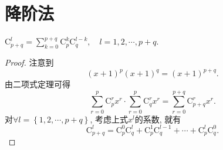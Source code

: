 \documentclass[../../main.tex]{subfiles}%
\begin{document}
\section{降阶法}

\begin{theorem}[Vandermode恒等式]\label{theorem:Vandermode恒等式}
$\mathrm{C}_{p+q}^{l}=\sum_{k=0}^{p+q}{\mathrm{C}_{p}^{k}\mathrm{C}_{q}^{l-k}},\quad l=1,2,\cdots,p+q.$
\end{theorem}
\begin{proof}

注意到
\[
\left( x+1 \right) ^p\left( x+1 \right) ^q=\left( x+1 \right) ^{p+q}.
\]
由二项式定理可得
\[
\sum_{r=0}^p{\mathrm{C}_{p}^{r}x^r}\cdot \sum_{r=0}^p{\mathrm{C}_{q}^{r}x^r}=\sum_{r=0}^{p+q}{\mathrm{C}_{p+q}^{r}x^r}.
\]
对$\forall l=\left\{ 1,2,\cdots ,p+q \right\}$, 考虑上式$x^l$的系数, 就有
\[
\mathrm{C}_{p+q}^{l}=\mathrm{C}_{p}^{0}\mathrm{C}_{q}^{l}+\mathrm{C}_{p}^{1}\mathrm{C}_{q}^{l-1}+\cdots +\mathrm{C}_{p}^{l}\mathrm{C}_{q}^{0}.
\]

\end{proof}
\end{document}
